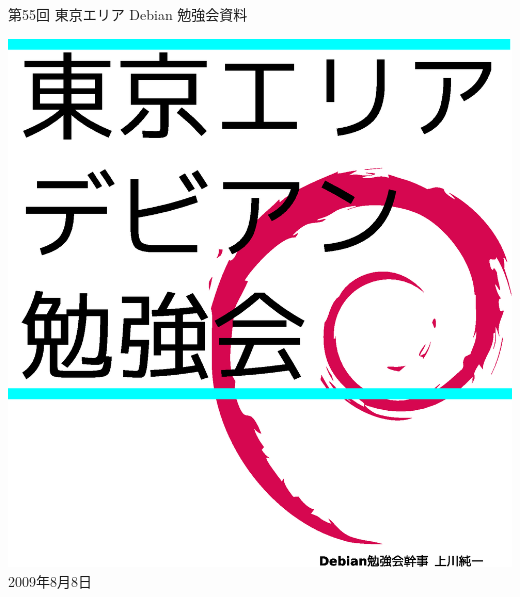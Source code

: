 \documentclass[mingoth,a4paper]{jsarticle}
\newcommand{\debmtgyear}{2009}
\newcommand{\debmtgmonth}{8}
\newcommand{\debmtgdate}{8}
\newcommand{\debmtgnumber}{55}
\begin{document}
\begin{titlepage}
\thispagestyle{empty}


\vspace*{-2cm}
第\debmtgnumber{}回 東京エリア Debian 勉強会資料

\hspace*{-2.4cm}
\includegraphics[width=210mm]{image200801/2008title.eps}\\
\hfill{}\debmtgyear{}年\debmtgmonth{}月\debmtgdate{}日

\end{titlepage}

\end{document}
